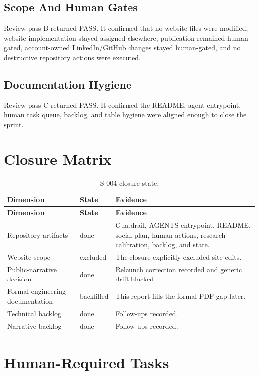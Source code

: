 \documentclass[a4paper,11pt,openany]{report}
\begin{document}
\section{Scope And Human Gates}

Review pass B returned PASS. It confirmed that no website files were modified,
website implementation stayed assigned elsewhere, publication remained
human-gated, account-owned LinkedIn/GitHub changes stayed human-gated, and no
destructive repository actions were executed.

\section{Documentation Hygiene}

Review pass C returned PASS. It confirmed the README, agent entrypoint, human
task queue, backlog, and table hygiene were aligned enough to close the sprint.

\chapter{Closure Matrix}

\begin{longtable}{p{} p{} p{}}
\caption{S-004 closure state.}\\
\toprule
\textbf{Dimension} & \textbf{State} & \textbf{Evidence} \\
\midrule
\endfirsthead
\toprule
\textbf{Dimension} & \textbf{State} & \textbf{Evidence} \\
\midrule
\endhead
Repository artifacts & done & Guardrail, AGENTS entrypoint, README, social plan, human actions, research calibration, backlog, and state. \\
Website scope & excluded & The closure explicitly excluded site edits. \\
Public-narrative decision & done & Relaunch correction recorded and generic drift blocked. \\
Formal engineering documentation & backfilled & This report fills the formal PDF gap later. \\
Technical backlog & done & Follow-ups recorded. \\
Narrative backlog & done & Follow-ups recorded. \\
\bottomrule
\end{longtable}

\chapter{Human-Required Tasks}
\end{document}
